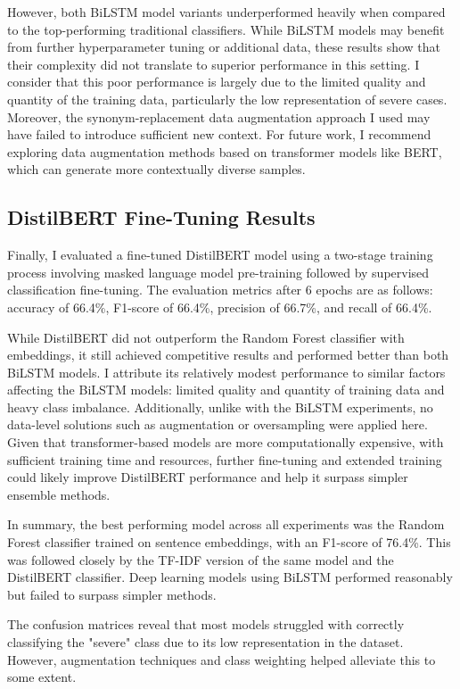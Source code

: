 However, both BiLSTM model variants underperformed heavily when compared to the top-performing traditional classifiers. While BiLSTM models may benefit from further hyperparameter tuning or additional data, these results show that their complexity did not translate to superior performance in this setting. I consider that this poor performance is largely due to the limited quality and quantity of the training data, particularly the low representation of severe cases. Moreover, the synonym-replacement data augmentation approach I used may have failed to introduce sufficient new context. For future work, I recommend exploring data augmentation methods based on transformer models like BERT, which can generate more contextually diverse samples.

\subsection{DistilBERT Fine-Tuning Results}

Finally, I evaluated a fine-tuned DistilBERT model using a two-stage training process involving masked language model pre-training followed by supervised classification fine-tuning. The evaluation metrics after 6 epochs are as follows: accuracy of 66.4\%, F1-score of 66.4\%, precision of 66.7\%, and recall of 66.4\%.

While DistilBERT did not outperform the Random Forest classifier with embeddings, it still achieved competitive results and performed better than both BiLSTM models. I attribute its relatively modest performance to similar factors affecting the BiLSTM models: limited quality and quantity of training data and heavy class imbalance. Additionally, unlike with the BiLSTM experiments, no data-level solutions such as augmentation or oversampling were applied here. Given that transformer-based models are more computationally expensive, with sufficient training time and resources, further fine-tuning and extended training could likely improve DistilBERT performance and help it surpass simpler ensemble methods.

In summary, the best performing model across all experiments was the Random Forest classifier trained on sentence embeddings, with an F1-score of 76.4\%. This was followed closely by the TF-IDF version of the same model and the DistilBERT classifier. Deep learning models using BiLSTM performed reasonably but failed to surpass simpler methods.

The confusion matrices reveal that most models struggled with correctly classifying the "severe" class due to its low representation in the dataset. However, augmentation techniques and class weighting helped alleviate this to some extent.
